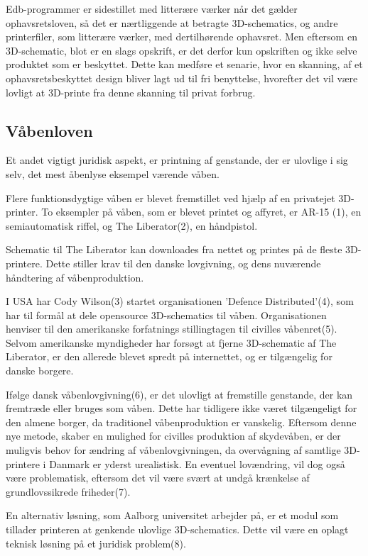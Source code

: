Edb-programmer er sidestillet med litterære værker når det gælder ophavsretsloven\autocite{retsinformation.dk_ophavsretsloven_2010}, så det er nærtliggende at betragte 3D-schematics, og andre printerfiler, som litterære værker, med dertilhørende ophavsret. Men eftersom en 3D-schematic, blot er en slags opskrift, er det derfor kun opskriften og ikke selve produktet som er beskyttet. Dette kan medføre et senarie, hvor en skanning, af et ophavsretsbeskyttet design bliver lagt ud til fri benyttelse, hvorefter det vil være lovligt at 3D-printe fra denne skanning til privat forbrug.

\subsection{Våbenloven}

Et andet vigtigt juridisk aspekt, er printning af genstande, der er ulovlige i sig selv, det mest åbenlyse eksempel værende våben.

Flere funktionsdygtige våben er blevet fremstillet ved hjælp af en privatejet 3D-printer. To eksempler på våben, som er blevet printet og affyret, er AR-15 (1), en semiautomatisk riffel, og The Liberator(2), en håndpistol. 

Schematic til The Liberator kan downloades fra nettet og printes på de fleste 3D-printere. Dette stiller krav til den danske lovgivning, og dens nuværende håndtering af våbenproduktion.

I USA har Cody Wilson(3) startet organisationen 'Defence Distributed'(4), som har til formål at dele opensource 3D-schematics til våben. Organisationen henviser til den amerikanske forfatnings stillingtagen til civilles våbenret(5). Selvom amerikanske myndigheder har forsøgt at fjerne 3D-schematic af The Liberator, er den allerede blevet spredt på internettet, og er tilgængelig for danske borgere.

Ifølge dansk våbenlovgivning(6), er det ulovligt at fremstille genstande, der kan fremtræde eller bruges som våben. Dette har tidligere ikke været tilgængeligt for den almene borger, da traditionel våbenproduktion er vanskelig. Eftersom denne nye metode, skaber en mulighed for civilles produktion af skydevåben, er der muligvis behov for ændring af våbenlovgivningen, da overvågning af samtlige 3D-printere i Danmark er yderst urealistisk. En eventuel lovændring, vil dog også være problematisk, eftersom det vil være svært at undgå krænkelse af grundlovssikrede friheder(7).

En alternativ løsning, som Aalborg universitet arbejder på, er et modul som tillader printeren at genkende ulovlige 3D-schematics. Dette vil være en oplagt teknisk løsning på et juridisk problem(8).

